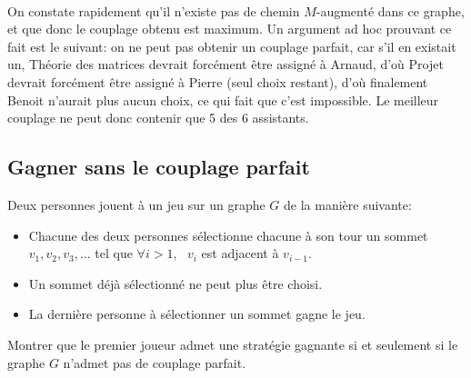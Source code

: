 \begin{solution}
\\
	On constate rapidement qu'il n'existe pas de chemin $M$-augmenté dans ce graphe, et que donc le couplage obtenu est maximum. Un argument ad hoc prouvant ce fait est le suivant: on ne peut pas obtenir un couplage parfait, car s'il en existait un, Théorie des matrices devrait forcément être assigné à Arnaud, d'où Projet devrait forcément être assigné à Pierre (seul choix restant), d'où finalement Benoit n'aurait plus aucun choix, ce qui fait que c'est impossible. Le meilleur couplage ne peut donc contenir que 5 des 6 assistants.
\end{solution}

\subsection{Gagner sans le couplage parfait}
Deux personnes jouent à un jeu sur un graphe $G$ de la manière suivante:

\begin{itemize}
  \item Chacune des deux personnes sélectionne chacune à son tour un sommet $v_1, v_2, v_3, …$ tel que $\forall i > 1, \ \ \ v_i$ est adjacent à $v_{i-1}$.
  \item Un sommet déjà sélectionné ne peut plus être choisi.
  \item La dernière personne à sélectionner un sommet gagne le jeu.
\end{itemize}

Montrer que le premier joueur admet une stratégie gagnante si et seulement si le graphe $G$ n'admet pas de couplage parfait.


